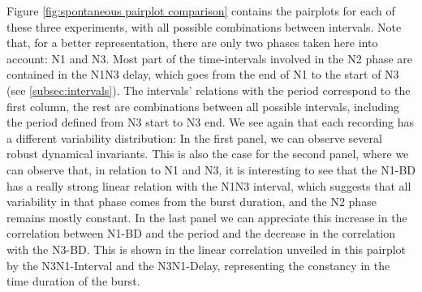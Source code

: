 Figure \ref{fig:spontaneous pairplot comparison} contains the pairplots for each of these three experiments, with all possible combinations between intervals. Note that, for a better representation, there are only two phases taken here into account: N1 and N3. Most part of the time-intervals involved in the N2 phase are contained in the N1N3 delay, which goes from the end of N1 to the start of N3 (see \ref{subsec:intervals}). The intervals' relations with the period correspond to the first column, the rest are combinations between all possible intervals, including the period defined from N3 start to N3 end. We see again that each recording has a different variability distribution: In the first panel, we can observe several robust dynamical invariants. This is also the case for the second panel, where we can observe that, in relation to N1 and N3, it is interesting to see that the N1-BD has a really strong linear relation with the N1N3 interval, which suggests that all variability in that phase comes from the burst duration, and the N2 phase remains mostly constant. In the last panel we can appreciate this increase in the correlation between N1-BD and the period and the decrease in the correlation with the N3-BD. This is shown in the linear correlation unveiled in this pairplot by the N3N1-Interval and the N3N1-Delay, representing the constancy in the time duration of the burst.  

